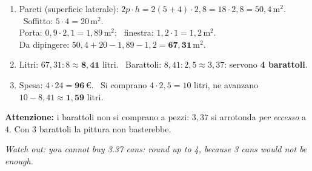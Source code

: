 \documentclass[11pt,a4paper]{article}
\newcommand{\unit}[1]{\,\mathrm{#1}}
\newcommand{\mq}{\unit{m^2}}
\newcommand{\errore}[2]{\begin{attenzione}\textbf{\color{fgA}Attenzione:} #1\par
  {\itshape\color{engray}Watch out: #2}\end{attenzione}}
\begin{document}
\begin{solbox}
\begin{enumerate}
\item Pareti (superficie laterale): $2p\cdot h=2(5+4)\cdot2,8=18\cdot2,8=50,4\mq$. \ Soffitto: $5\cdot4=20\mq$.\\
Porta: $0,9\cdot2,1=1,89\mq$; \ finestra: $1,2\cdot1=1,2\mq$.\\
Da dipingere: $50,4+20-1,89-1,2=\mathbf{67,31\mq}$.
\item Litri: $67,31:8\approx\mathbf{8,41}$ litri. \ Barattoli: $8,41:2,5\approx3,37$: servono \textbf{4 barattoli}.
\item Spesa: $4\cdot24=\mathbf{96}$\,€. \ Si comprano $4\cdot2,5=10$ litri, ne avanzano $10-8,41\approx\mathbf{1,59}$ litri.
\end{enumerate}
\errore{i barattoli non si comprano a pezzi: $3,37$ si arrotonda \emph{per eccesso} a $4$. Con 3 barattoli la pittura non basterebbe.}
{you cannot buy 3.37 cans: round up to 4, because 3 cans would not be enough.}
\end{solbox}
\end{document}
